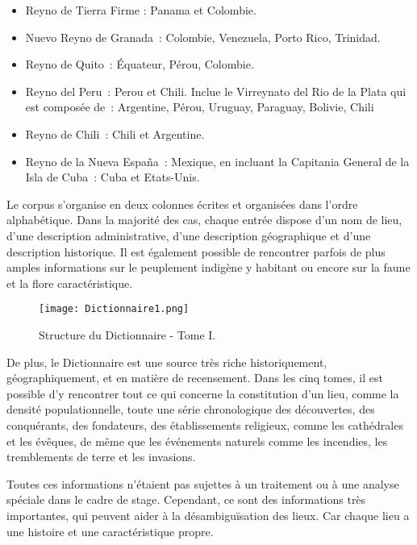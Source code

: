 \documentclass[a4paper,12pt,twoside]{book}
\begin{document}
	\begin{itemize}

     \item Reyno de Tierra Firme : Panama et Colombie.\\
     \item Nuevo Reyno de Granada : Colombie, Venezuela, Porto Rico, Trinidad.\\
     \item Reyno de Quito : Équateur, Pérou, Colombie.\\
     \item Reyno del Peru : Perou et Chili. Inclue le Virreynato del Rio de la Plata qui est composée de : Argentine, Pérou, Uruguay, Paraguay, Bolivie, Chili\\
     \item Reyno de Chili : Chili et Argentine.\\
     \item Reyno de la Nueva España : Mexique, en incluant la Capitania General de la Isla de Cuba : Cuba et Etats-Unis.\\
\end{itemize}


Le corpus s’organise en deux colonnes écrites et organisées dans l’ordre alphabétique. Dans la majorité des cas, chaque entrée dispose d’un nom de lieu, d’une description administrative, d’une description géographique et d’une description historique. Il est également possible de rencontrer parfois de plus amples informations sur le peuplement indigène y habitant ou encore sur la faune et la flore caractéristique.\\



\begin{figure}[!h]
    \centering
    \texttt{[image: Dictionnaire1.png]}
    \caption{Structure du Dictionnaire - Tome I.}
    \label{premFig}
\end{figure}


De plus, le Dictionnaire est une source très riche historiquement, géographiquement, et en matière de recensement. Dans les cinq tomes, il est possible d’y rencontrer tout ce qui concerne la constitution d’un lieu, comme la densité populationnelle, toute une série chronologique des découvertes, des conquérants, des fondateurs, des établissements religieux, comme les cathédrales et les évêques, de même que les événements naturels comme les incendies, les tremblements de terre et les invasions.

Toutes ces informations n’étaient pas sujettes à un traitement ou à une analyse spéciale dans le cadre de stage. Cependant, ce sont des informations très importantes, qui peuvent aider à la désambiguïsation des lieux. Car chaque lieu a une histoire et une caractéristique propre.
\end{document}
